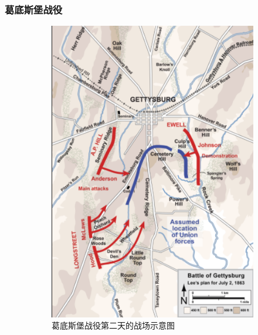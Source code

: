 \documentclass{beamer}
\begin{document}
\begin{frame}
\frametitle{葛底斯堡战役}

\begin{figure}[htb]
  \begin{subfigure}[b]{0.26\linewidth}
    \includegraphics[width=\linewidth]{gettysburg-map.png}
    \caption{葛底斯堡战役第二天的战场示意图}
  \end{subfigure}
  \begin{subfigure}[b]{0.26\linewidth}

\end{subfigure}
\end{figure}
\end{frame}
\end{document}
